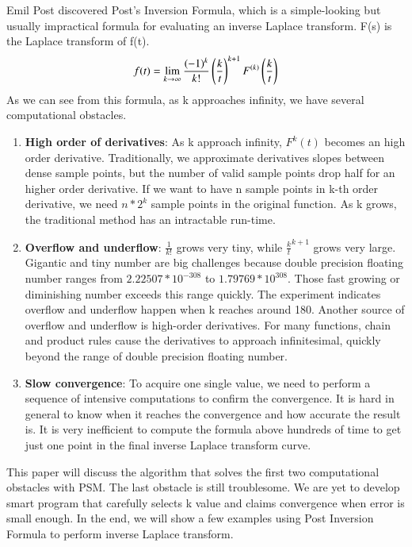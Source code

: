 \documentclass[12pt]{article}
\begin{document}
Emil Post discovered Post's Inversion Formula, which is a simple-looking but usually impractical formula for evaluating an inverse Laplace transform. F(s) is the Laplace transform of f(t).
\begin{equation*}
f(t) = \lim_{k \rightarrow \infty}\frac{(-1)^{k}}{k!} \left(\frac{k}{t}\right)^{k+1}  F^{(k)} \left(\frac{k}{t}\right)
\end{equation*}
As we can see from this formula, as k approaches infinity, we have several computational obstacles. 
\begin{enumerate}
\item
	\textbf{High order of derivatives}: As k approach infinity, $F^k(t)$ becomes an high order derivative. Traditionally, we approximate derivatives slopes between dense sample points, but the number of valid sample points drop half for an higher order derivative. If we want to have n sample points in k-th order derivative, we need $n*2^{k}$ sample points in the original function. As k grows, the traditional method has an intractable run-time.

\item 
	\textbf{Overflow and underflow}: $\frac{1}{k!}$ grows very tiny, while $\frac{k}{t}^{k+1}$ grows very large. Gigantic and tiny number are big challenges because double precision floating number ranges from $2.22507*10^{-308}$ to  $1.79769*10^{308}$. Those fast growing or diminishing number exceeds this range quickly. The experiment indicates overflow and underflow happen when k reaches around 180.
	Another source of overflow and underflow is high-order derivatives. For many functions, chain and product rules cause the derivatives to approach infinitesimal, quickly beyond the range of double precision floating number.

\item
 	\textbf{Slow convergence}: To acquire one single value, we need to perform a sequence of intensive computations to confirm the convergence. It is hard in general to know when it reaches the convergence and how accurate the result is. It is very inefficient to compute the formula above hundreds of time to get just one point in the final inverse Laplace transform curve.
\end{enumerate}

This paper will discuss the algorithm that solves the first two computational obstacles with PSM. The last obstacle is still troublesome. We are yet to develop smart program that carefully selects k value and claims convergence when error is small enough. In the end, we will show a few examples using Post Inversion Formula to perform inverse Laplace transform.
\end{document}

